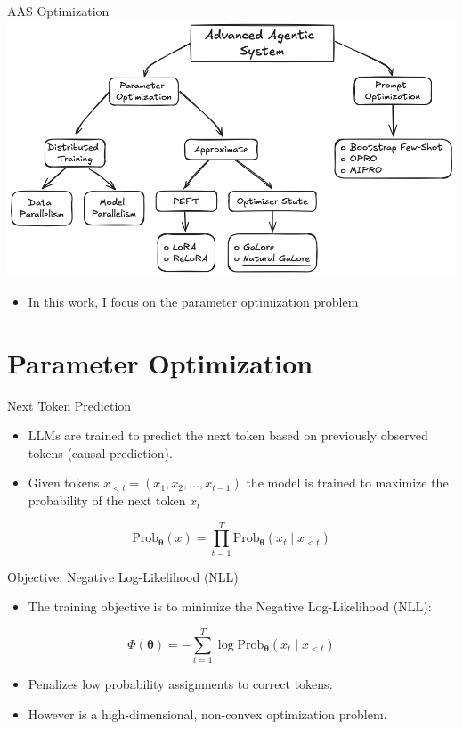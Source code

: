 \documentclass{beamer}
\begin{document}
\begin{frame}{AAS Optimization}
    \includegraphics[width=\textwidth]{figures/AAS Optimization.png}
    \begin{itemize}
        \item In this work, I focus on the parameter optimization problem
    \end{itemize}
\end{frame}

\section{Parameter Optimization}

\begin{frame}{Next Token Prediction}
    \begin{itemize}
        \item LLMs are trained to predict the next token based on previously observed tokens (causal prediction).
        \item Given tokens \( x_{<t} = (x_1, x_2, \dots, x_{t-1}) \) the model is trained to maximize the probability of the next token \( x_t \)
    \end{itemize}
    \begin{equation}
        \text{Prob}_{\mathbf{\theta}}(x) = \prod_{t=1}^{T} \text{Prob}_{\mathbf{\theta}}(x_t \mid x_{<t})
    \end{equation}
\end{frame}

\begin{frame}{Objective: Negative Log-Likelihood (NLL)}
    \begin{itemize}
        \item The training objective is to minimize the Negative Log-Likelihood (NLL):
    \end{itemize}
    \begin{equation}
        \Phi(\mathbf{\theta}) = -\sum_{t=1}^{T} \log \text{Prob}_{\mathbf{\theta}}(x_t \mid x_{<t})
        \label{eq:cross_entropy_loss}
    \end{equation}
    \begin{itemize}
        \item Penalizes low probability assignments to correct tokens.
        \item However is a high-dimensional, non-convex optimization problem.
    \end{itemize}
\end{frame}
\end{document}
